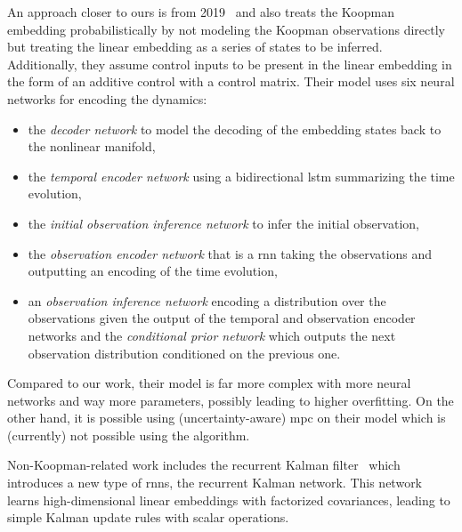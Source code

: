 An approach closer to ours is from 2019~\cite{mortonDeepVariationalKoopman2019a} and also treats the Koopman embedding probabilistically by not modeling the Koopman observations directly but treating the linear embedding as a series of states to be inferred. Additionally, they assume control inputs to be present in the linear embedding in the form of an additive control with a control matrix. Their model uses six neural networks for encoding the dynamics:
\begin{itemize}
	\item the \emph{decoder network} to model the decoding of the embedding states back to the nonlinear manifold,
	\item the \emph{temporal encoder network} using a bidirectional \ac{lstm} summarizing the time evolution,
	\item the \emph{initial observation inference network} to infer the initial observation,
	\item the \emph{observation encoder network} that is a \ac{rnn} taking the observations and outputting an encoding of the time evolution,
	\item an \emph{observation inference network} encoding a distribution over the observations given the output of the temporal and observation encoder networks and
	the \emph{conditional prior network} which outputs the next observation distribution conditioned on the previous one.
\end{itemize}
Compared to our work, their model is far more complex with more neural networks and way more parameters, possibly leading to higher overfitting. On the other hand, it is possible using (uncertainty-aware) \ac{mpc} on their model which is (currently) not possible using the \algname algorithm.

Non-Koopman-related work includes the recurrent Kalman filter~\cite{beckerRecurrentKalmanNetworks2019a} which introduces a new type of \acp{rnn}, the recurrent Kalman network. This network learns high-dimensional linear embeddings with factorized covariances, leading to simple Kalman update rules with scalar operations.
